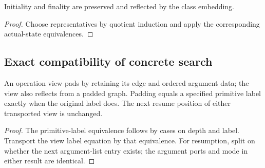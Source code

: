 




\begin{lemma}
Initiality and finality are preserved and reflected by the class embedding.
\end{lemma}

\begin{proof}
Choose representatives by quotient induction and apply the corresponding actual-state equivalences.
\end{proof}



\subsection{Exact compatibility of concrete search}


\begin{lemma}
An operation view pads by retaining its edge and ordered argument data; the view also reflects from a padded graph. Padding equals a specified primitive label exactly when the original label does. The next resume position of either transported view is unchanged.
\end{lemma}

\begin{proof}
The primitive-label equivalence follows by cases on depth and label. Transport the view label equation by that equivalence. For resumption, split on whether the next argument-list entry exists; the argument ports and mode in either result are identical.
\end{proof}





